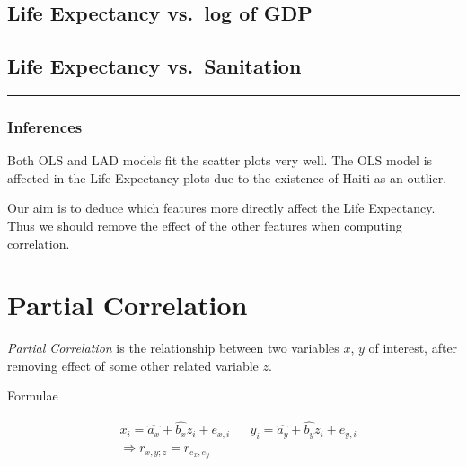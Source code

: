 \documentclass[
]{article}
\begin{document}
\hypertarget{life-expectancy-vs.-log-of-gdp-1}{%
\subsection{Life Expectancy vs.~log of
GDP}\label{life-expectancy-vs.-log-of-gdp-1}}

\hypertarget{life-expectancy-vs.-sanitation}{%
\subsection{Life Expectancy
vs.~Sanitation}\label{life-expectancy-vs.-sanitation}}

\begin{center}\rule{0.5\linewidth}{0.5pt}\end{center}

\hypertarget{inferences-2}{%
\subsubsection{Inferences}\label{inferences-2}}

Both OLS and LAD models fit the scatter plots very well. The OLS model
is affected in the Life Expectancy plots due to the existence of Haiti
as an outlier.

Our aim is to deduce which features more directly affect the Life
Expectancy. Thus we should remove the effect of the other features when
computing correlation.

\hypertarget{partial-correlation}{%
\section{Partial Correlation}\label{partial-correlation}}

\emph{Partial Correlation} is the relationship between two variables
\(x\), \(y\) of interest, after removing effect of some other related
variable \(z\).

Formulae

\[
\begin{aligned}
&x_i = \hat{a_x} + \hat{b_x} z_i + e_{x,i} &&
y_i = \hat{a_y} + \hat{b_y} z_i + e_{y,i}
\\
&\Rightarrow r_{x,y;z} = r_{e_{x}, e_{y}}
\end{aligned}
\]
\end{document}
